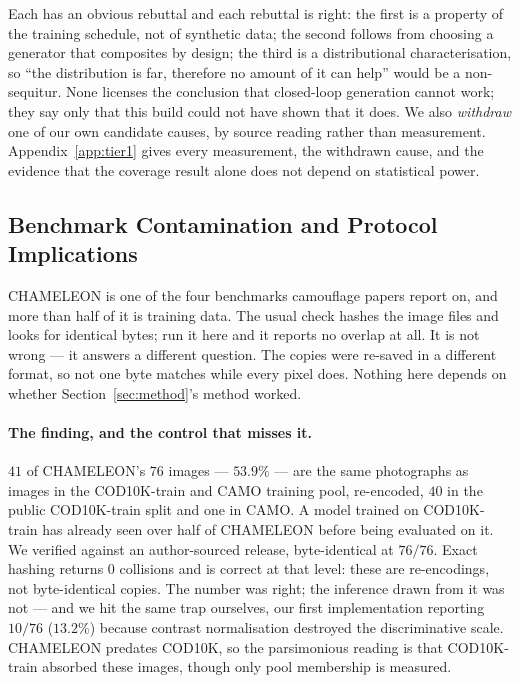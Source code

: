 \documentclass{article} %
\begin{document}
Each has an obvious rebuttal and each rebuttal is right: the first is a property of the training
schedule, not of synthetic data; the second follows from choosing a generator that composites by
design; the third is a distributional characterisation, so ``the distribution is far, therefore no
amount of it can help'' would be a non-sequitur. None licenses the conclusion that closed-loop
generation cannot work; they say only that this build could not have shown that it does. We also
\emph{withdraw} one of our own candidate causes, by source reading rather than measurement.
Appendix~\ref{app:tier1} gives every measurement, the withdrawn cause, and the evidence that the
coverage result alone does not depend on statistical power.

\subsection{Benchmark Contamination and Protocol Implications}
\label{sec:contamination}

CHAMELEON is one of the four benchmarks camouflage papers report on, and more than half of it is
training data. The usual check hashes the image files and looks for identical bytes; run it here and
it reports no overlap at all. It is not wrong --- it answers a different question. The copies were
re-saved in a different format, so not one byte matches while every pixel does. Nothing here depends
on whether Section~\ref{sec:method}'s method worked.

\paragraph{The finding, and the control that misses it.} $41$ of CHAMELEON's $76$ images ---
$53.9\%$ --- are the same photographs as images in the COD10K-train and CAMO training pool,
re-encoded, $40$ in the public COD10K-train split and one in CAMO. A model trained on COD10K-train
has already seen over half of CHAMELEON before being evaluated on it. We verified against an author-sourced release, byte-identical at $76/76$. Exact hashing returns $0$
collisions and is correct at that level: these are re-encodings, not byte-identical copies. The
number was right; the inference drawn from it was not --- and we hit the same trap ourselves, our
first implementation reporting $10/76$ ($13.2\%$) because contrast normalisation destroyed the
discriminative scale. CHAMELEON predates COD10K, so the parsimonious reading is that COD10K-train
absorbed these images, though only pool membership is measured.
\end{document}
